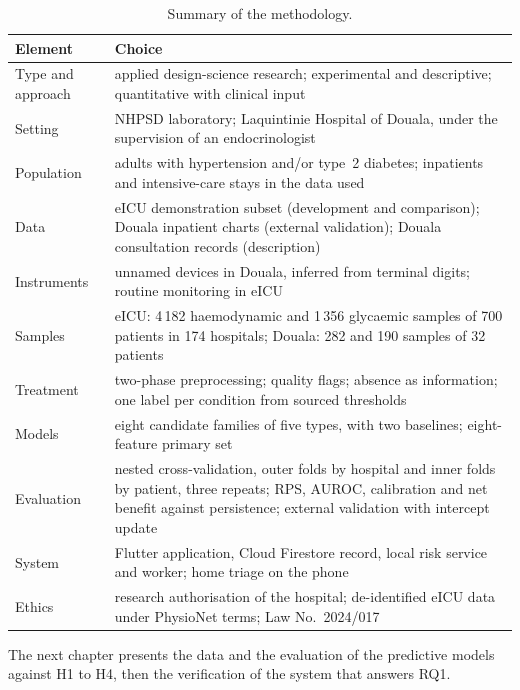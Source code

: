 \documentclass[11pt,a4paper,oneside]{report}
\begin{document}
\begin{table}[htbp]
\centering\footnotesize
\caption{Summary of the methodology.}\label{tab:meth-summary}
\begin{tabularx}{\textwidth}{@{}>{\raggedright\arraybackslash}p{3.0cm} X@{}}
\toprule
\textbf{Element} & \textbf{Choice} \\
\midrule
Type and approach & applied design-science research; experimental and descriptive; quantitative with clinical input \\
Setting & NHPSD laboratory; Laquintinie Hospital of Douala, under the supervision of an endocrinologist \\
Population & adults with hypertension and/or type~2 diabetes; inpatients and intensive-care stays in the data used \\
Data & eICU demonstration subset (development and comparison); Douala inpatient charts (external validation); Douala consultation records (description) \\
Instruments & unnamed devices in Douala, inferred from terminal digits; routine monitoring in eICU \\
Samples & eICU: 4\,182 haemodynamic and 1\,356 glycaemic samples of 700 patients in 174 hospitals; Douala: 282 and 190 samples of 32 patients \\
Treatment & two-phase preprocessing; quality flags; absence as information; one label per condition from sourced thresholds \\
Models & eight candidate families of five types, with two baselines; eight-feature primary set \\
Evaluation & nested cross-validation, outer folds by hospital and inner folds by patient, three repeats; RPS, AUROC, calibration and net benefit against persistence; external validation with intercept update \\
System & Flutter application, Cloud Firestore record, local risk service and worker; home triage on the phone \\
Ethics & research authorisation of the hospital; de-identified eICU data under PhysioNet terms; Law No.~2024/017 \\
\bottomrule
\end{tabularx}
\end{table}

The next chapter presents the data and the evaluation of the predictive models against H1 to H4, then the verification of the system that answers RQ1.


\end{document}

